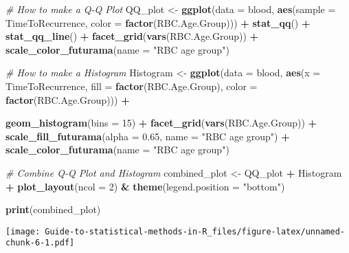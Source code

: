 \documentclass[
]{article}
\newenvironment{Shaded}{\begin{snugshade}}{\end{snugshade}}
\newcommand{\AttributeTok}[1]{\textcolor[rgb]{0.13,0.29,0.53}{#1}}
\newcommand{\CommentTok}[1]{\textcolor[rgb]{0.56,0.35,0.01}{\textit{#1}}}
\newcommand{\DecValTok}[1]{\textcolor[rgb]{0.00,0.00,0.81}{#1}}
\newcommand{\FloatTok}[1]{\textcolor[rgb]{0.00,0.00,0.81}{#1}}
\newcommand{\FunctionTok}[1]{\textcolor[rgb]{0.13,0.29,0.53}{\textbf{#1}}}
\newcommand{\NormalTok}[1]{#1}
\newcommand{\OtherTok}[1]{\textcolor[rgb]{0.56,0.35,0.01}{#1}}
\newcommand{\SpecialCharTok}[1]{\textcolor[rgb]{0.81,0.36,0.00}{\textbf{#1}}}
\newcommand{\StringTok}[1]{\textcolor[rgb]{0.31,0.60,0.02}{#1}}
\begin{document}
\begin{Shaded}
\begin{Highlighting}[]
\CommentTok{\# How to make a Q{-}Q Plot}
\NormalTok{QQ\_plot }\OtherTok{\textless{}{-}} \FunctionTok{ggplot}\NormalTok{(}\AttributeTok{data =}\NormalTok{ blood, }
                  \FunctionTok{aes}\NormalTok{(}\AttributeTok{sample =}\NormalTok{ TimeToRecurrence, }
                      \AttributeTok{color =} \FunctionTok{factor}\NormalTok{(RBC.Age.Group))) }\SpecialCharTok{+} 
  \FunctionTok{stat\_qq}\NormalTok{() }\SpecialCharTok{+}
  \FunctionTok{stat\_qq\_line}\NormalTok{() }\SpecialCharTok{+}
  \FunctionTok{facet\_grid}\NormalTok{(}\FunctionTok{vars}\NormalTok{(RBC.Age.Group)) }\SpecialCharTok{+}
  \FunctionTok{scale\_color\_futurama}\NormalTok{(}\AttributeTok{name =} \StringTok{"RBC age group"}\NormalTok{)}

\CommentTok{\# How to make a Histogram}
\NormalTok{Histogram }\OtherTok{\textless{}{-}} \FunctionTok{ggplot}\NormalTok{(}\AttributeTok{data =}\NormalTok{ blood, }
                    \FunctionTok{aes}\NormalTok{(}\AttributeTok{x =}\NormalTok{ TimeToRecurrence, }
                        \AttributeTok{fill =} \FunctionTok{factor}\NormalTok{(RBC.Age.Group), }
                        \AttributeTok{color =} \FunctionTok{factor}\NormalTok{(RBC.Age.Group))) }\SpecialCharTok{+}
  
  \FunctionTok{geom\_histogram}\NormalTok{(}\AttributeTok{bins =} \DecValTok{15}\NormalTok{) }\SpecialCharTok{+}
  \FunctionTok{facet\_grid}\NormalTok{(}\FunctionTok{vars}\NormalTok{(RBC.Age.Group)) }\SpecialCharTok{+}
  \FunctionTok{scale\_fill\_futurama}\NormalTok{(}\AttributeTok{alpha =} \FloatTok{0.65}\NormalTok{, }\AttributeTok{name =} \StringTok{"RBC age group"}\NormalTok{) }\SpecialCharTok{+}
  \FunctionTok{scale\_color\_futurama}\NormalTok{(}\AttributeTok{name =} \StringTok{"RBC age group"}\NormalTok{) }
  
\CommentTok{\# Combine Q{-}Q Plot and Histogram}
\NormalTok{combined\_plot }\OtherTok{\textless{}{-}}\NormalTok{ QQ\_plot }\SpecialCharTok{+}\NormalTok{ Histogram }\SpecialCharTok{+} 
  \FunctionTok{plot\_layout}\NormalTok{(}\AttributeTok{ncol =} \DecValTok{2}\NormalTok{) }\SpecialCharTok{\&} \FunctionTok{theme}\NormalTok{(}\AttributeTok{legend.position =} \StringTok{"bottom"}\NormalTok{)}

\FunctionTok{print}\NormalTok{(combined\_plot)}
\end{Highlighting}
\end{Shaded}

\texttt{[image: Guide-to-statistical-methods-in-R\_files/figure-latex/unnamed-chunk-6-1.pdf]}
\end{document}
